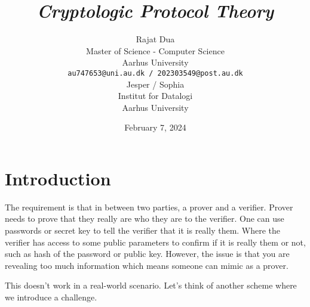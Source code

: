 \documentclass{article}
\title{\emph{Cryptologic Protocol Theory}}
\author{{\hspace{1mm}Rajat Dua} \\
	Master of Science - Computer Science\\
	Aarhus University\\
	\texttt{au747653@uni.au.dk / 202303549@post.au.dk} \\
	\And
	{\hspace{1mm}Jesper / Sophia} \\
	Institut for Datalogi\\
	Aarhus University\\
}
\date{February 7, 2024}
\begin{document}
\maketitle
\vspace{-1cm}

\section{Introduction}

The requirement is that in between two parties, a prover and a verifier. Prover needs to prove that they really are who they are to the verifier. One can use passwords or secret key to tell the verifier that it is really them. Where the verifier has access to some public parameters to confirm if it is really them or not, such as hash of the password or public key. However, the issue is that you are revealing too much information which means someone can mimic as a prover.

This doesn't work in a real-world scenario. Let's think of another scheme where we introduce a challenge. 
\end{document}
